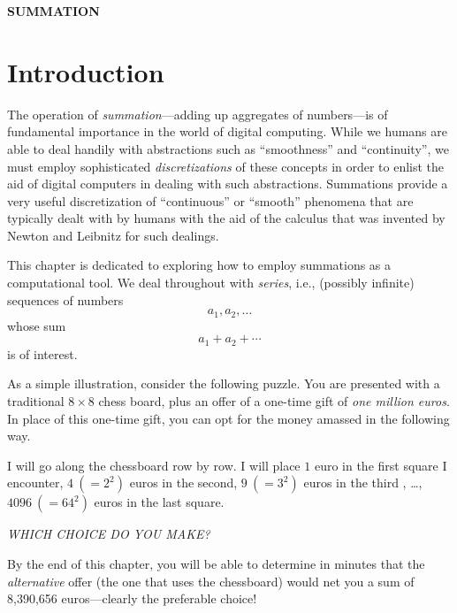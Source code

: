 \documentclass{article}
\begin{document}
\begin{center}
{\bf SUMMATION}
\end{center}


\section{Introduction}
\label{sec:intro}

The operation of {\it summation}---adding up aggregates of
numbers---is of fundamental importance in the world of digital
computing.  While we humans are able to deal handily with abstractions
such as ``smoothness'' and ``continuity'', we must employ
sophisticated {\em discretizations} of these concepts in order to
enlist the aid of digital computers in dealing with such abstractions.
Summations provide a very useful discretization of ``continuous'' or
``smooth'' phenomena that are typically dealt with by humans with the
aid of the calculus that was invented by Newton and Leibnitz for such
dealings.

This chapter is dedicated to exploring how to employ summations as a
computational tool.  We deal throughout with {\it series}, i.e.,
(possibly infinite) sequences of numbers
\[ a_1, a_2, \ldots \]
whose sum
\[ a_1 + a_2 + \cdots \]
is of interest.

As a simple illustration, consider the following puzzle.  You are
presented with a traditional $8 \times 8$ chess board, plus an offer
of a one-time gift of {\em one million euros}.  In place of this
one-time gift, you can opt for the money amassed in the following
way.

\noindent
%
I will go along the chessboard row by row.  I will place $1$ euro in
the first square I encounter, $4 \ (= 2^2)$ euros in the second, $9
\ (= 3^2)$ euros in the third , \ldots, $4096 \ (= 64^2)$ euros in the
last square.

\noindent
{\em WHICH CHOICE DO YOU MAKE?}

\medskip

By the end of this chapter, you will be able to determine in minutes
that the {\em alternative} offer (the one that uses the chessboard)
would net you a sum of 8,390,656 euros---clearly the preferable
choice!
\end{document}

